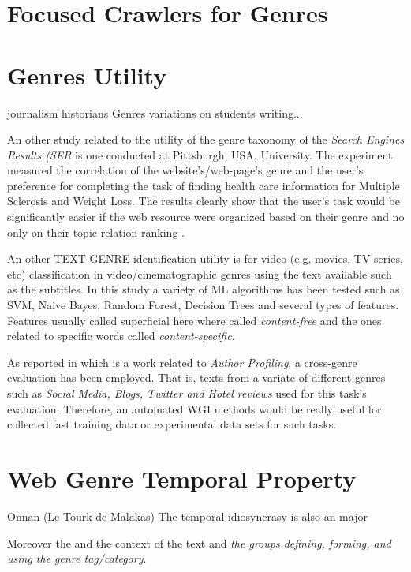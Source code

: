 \section{Focused Crawlers for Genres}\label{chap:relevant_work:sec:intro}

\section{Genres Utility}\label{chap:relevant_work:sec:intro}
journalism historians
Genres variations on students writing...

An other study related to the utility of the genre taxonomy of the \textit{Search Engines Results (SER} is one conducted at Pittsburgh, USA, University.  The experiment measured the correlation of the website's/web-page's genre and the user's preference for completing the task of finding health care information for Multiple Sclerosis and Weight Loss. The results clearly show that the user's task would be significantly easier if the web resource were organized based on their genre and no only on their topic relation ranking \parencite{chi2018sources}.

An other TEXT-GENRE identification utility is for video (e.g. movies, TV series, etc) classification in video/cinematographic genres using the text available such as the subtitles. In this study a variety of ML algorithms has been tested such as SVM, Naive Bayes, Random Forest, Decision Trees and several types of features. Features usually called superficial here where called \textit{content-free} and the ones related to specific words called \textit{content-specific}\parencite{lee2017text}.

As reported in \parencite{rangel2016overview} which is a work related to \textit{Author Profiling}, a cross-genre evaluation has been employed. That is, texts from a variate of different genres such as \textit{Social Media, Blogs, Twitter and Hotel reviews} used for this task's evaluation. Therefore, an automated WGI methods would be really useful for collected fast training data or experimental data sets for such tasks.

\section{Web Genre Temporal Property}\label{chap:relevant_work:sec:intro}
Onnan (Le Tourk de Malakas)
The temporal idiosyncrasy is also an major  

Moreover the  and the context of the text and \textit{the groups defining, forming, and using the genre tag/category}.

